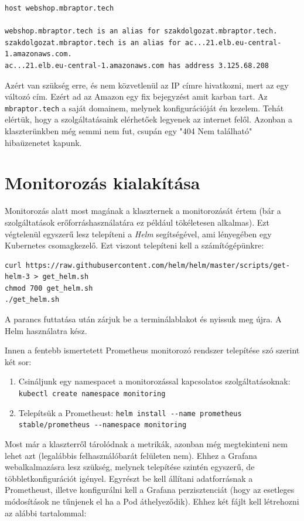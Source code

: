 \begin{lstlisting}
host webshop.mbraptor.tech

webshop.mbraptor.tech is an alias for szakdolgozat.mbraptor.tech.
szakdolgozat.mbraptor.tech is an alias for ac...21.elb.eu-central-1.amazonaws.com.
ac...21.elb.eu-central-1.amazonaws.com has address 3.125.68.208
\end{lstlisting}
Azért van szükség erre, és nem közvetlenül az IP címre hivatkozni, mert az egy változó cím. Ezért ad az Amazon egy fix bejegyzést amit karban tart. Az \lstinline{mbraptor.tech} a saját domainem, melynek konfigurációját én kezelem.
Tehát elértük, hogy a szolgáltatásaink elérhetőek legyenek az internet felől. Azonban a klaszterünkben még semmi nem fut, csupán egy "404 Nem található" hibaüzenetet kapunk.
\section{Monitorozás kialakítása}
Monitorozás alatt most magának a klaszternek a monitorozását értem (bár a szolgáltatások erőforráshasználatára ez például tökéletesen alkalmas). Ezt végtelenül egyszerű lesz telepíteni a \textit{Helm} segítségével, ami lényegében egy Kubernetes csomagkezelő. Ezt viszont telepíteni kell a számítógépünkre:
\begin{lstlisting}
curl https://raw.githubusercontent.com/helm/helm/master/scripts/get-helm-3 > get_helm.sh
chmod 700 get_helm.sh
./get_helm.sh
\end{lstlisting}
A parancs futtatása után zárjuk be a terminálablakot és nyissuk meg újra. A Helm használatra kész.

Innen a fentebb ismertetett Prometheus monitorozó rendszer telepítése szó szerint két sor:
\begin{enumerate}
    \item Csináljunk egy namespacet a monitorozással kapcsolatos szolgáltatásoknak: \lstinline{kubectl create namespace monitoring}
    \item Telepítsük a Prometheust: \lstinline{helm install --name prometheus stable/prometheus --namespace monitoring}
\end{enumerate}

Most már a klaszterről tárolódnak a metrikák, azonban még megtekinteni nem lehet azt (legalábbis felhasználóbarát felületen nem). Ehhez a Grafana webalkalmazásra lesz szükség, melynek telepítése szintén egyszerű, de többletkonfigurációt igényel. Egyrészt be kell állítani adatforrásnak a Prometheust, illetve konfigurálni kell a Grafana perzisztenciát (hogy az esetleges módosítások ne tűnjenek el ha a Pod áthelyeződik). Ehhez két fájlt kell létrehozni az alábbi tartalommal:

